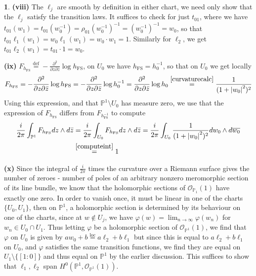 \documentclass[10.5pt]{article}
\theoremstyle{definition}
\newtheorem{pb}{}
\newcommand{\set}[1]{\{#1\}}
\newcommand{\abs}[1]{\left\vert#1\right\vert}
\newcommand{\pzpz}{\frac{\partial^2}{\partial z \partial \bar{z}}}
\begin{document}
\begin{pb}
        \textbf{(viii)} The \(\ell_j\) are smooth by definition in either chart, we need only show that the \(\ell_j\) satisfy the transition laws. It suffices to check for just \(t_{01}\), where we have \(t_{01}(w_1) = t_{01}(w_0^{-1}) = \rho_{01}(w_0^{-1})^{-1} = (w_0^{-1})^{-1} = w_0\), so that \(t_{01}\ell_1(w_1) = w_0\ell_1(w_1) = w_0\cdot w_1 = 1\). Similarly for \(\ell_2\), we get \(t_{01}\ell_2(w_1) = t_{01}\cdot 1 = w_0\).

        \textbf{(ix)} \(F_{h_{\text{FS}}} \overset{\text{def}}{=} -\pzpz \log h_{\text{FS}}\), on \(U_0\) we have \(h_{\text{FS}} = h_0^{-1}\), so that on \(U_0\) we get locally
        \begin{align}
            F_{h_{\text{FS}}} = -\pzpz \log h_{\text{FS}} = -\pzpz \log h_0^{-1} = \pzpz \log h_0 \overset{\eqref{curvaturecalc}}{=} \frac{1}{(1 + \abs{w_0}^2)^2}
        \end{align}
        Using this expression, and that \(\mathbb{P}^1 \setminus U_0\) has measure zero, we use that the expression of \(F_{h_{\text{FS}}}\) differs from \(F_{h^{-1}_{\text{FS}}}\) to compute
        \begin{align}
            \frac{i}{2\pi}\int_{\mathbb{P}^1}F_{h_{\text{FS}}}dz\wedge d\bar{z} &= \frac{i}{2\pi}\int_{U_0}F_{h_{\text{FS}}}dz\wedge d\bar{z} = \frac{i}{2\pi}\int_{U_0}\frac{1}{(1 + \abs{w_0}^2)^2}dw_0\wedge d\overline{w_0} \\
            &\overset{\eqref{computeint}}{=} 1
        \end{align}

        \textbf{(x)} Since the integral of \(\frac{i}{2\pi}\) times the curvature over a Riemann surface gives the number of zeroes - number of poles of an arbitrary nonzero meromorphic section of its line bundle, we know that the holomorphic sections of \(\mathcal{O}_{\mathbb{P}_1}(1)\) have exactly one zero. In order to vanish once, it must be linear in one of the charts \(\set{U_0,U_1}\), then on \(\mathbb{P}^1\), a holomorphic section is determined by its behaviour on one of the charts, since at \(w \not \in U_j\), we have \(\varphi(w) = \lim_{n \to \infty} \varphi(w_n)\) for \(w_n \in U_0 \cap U_1\). Thus letting \(\varphi\) be a holomorphic section of \(\mathcal{O}_{\mathbb{P}^1}(1)\), we find that \(\varphi\) on \(U_0\) is given by \(aw_0 + b \overset{\text{loc}}{=} a \ell_2 + b \ell_1\) but since this is equal to \(a \ell_2 + b\ell_1\) on \(U_0\), and \(\varphi\) satisfies the same transition functions, we find they are equal on \(U_1 \setminus \set{[1:0]}\) and thus equal on \(\mathbb{P}^1\) by the earlier discussion. This suffices to show that \(\ell_1,\ell_2\) span \(H^0(\mathbb{P}^1,\mathcal{O}_{\mathbb{P}^1}(1))\).

    \end{pb}
\end{document}
